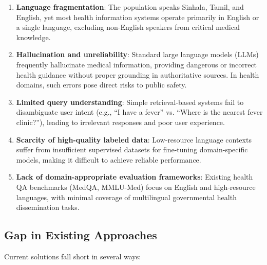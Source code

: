 \documentclass[11pt,a4paper]{article}
\begin{document}
\begin{enumerate}
    \item \textbf{Language fragmentation}: The population speaks Sinhala, Tamil, and English, yet most health information systems operate primarily in English or a single language, excluding non-English speakers from critical medical knowledge.
    
    \item \textbf{Hallucination and unreliability}: Standard large language models (LLMs) frequently hallucinate medical information, providing dangerous or incorrect health guidance without proper grounding in authoritative sources. In health domains, such errors pose direct risks to public safety.
    
    \item \textbf{Limited query understanding}: Simple retrieval-based systems fail to disambiguate user intent (e.g., ``I have a fever'' vs. ``Where is the nearest fever clinic?''), leading to irrelevant responses and poor user experience.
    
    \item \textbf{Scarcity of high-quality labeled data}: Low-resource language contexts suffer from insufficient supervised datasets for fine-tuning domain-specific models, making it difficult to achieve reliable performance.
    
    \item \textbf{Lack of domain-appropriate evaluation frameworks}: Existing health QA benchmarks (MedQA, MMLU-Med) focus on English and high-resource languages, with minimal coverage of multilingual governmental health dissemination tasks.
\end{enumerate}

\subsection{Gap in Existing Approaches}
\label{sec:gap}

Current solutions fall short in several ways:
\end{document}
